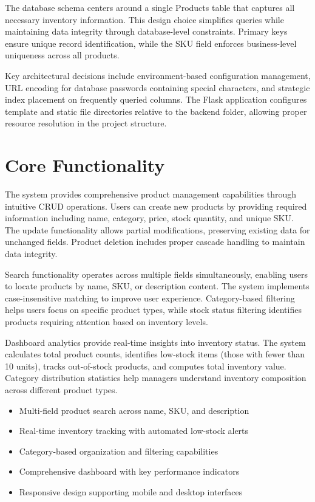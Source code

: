 \documentclass[12pt,a4paper]{article}
\begin{document}
The database schema centers around a single Products table that captures all necessary inventory information. This design choice simplifies queries while maintaining data integrity through database-level constraints. Primary keys ensure unique record identification, while the SKU field enforces business-level uniqueness across all products.

Key architectural decisions include environment-based configuration management, URL encoding for database passwords containing special characters, and strategic index placement on frequently queried columns. The Flask application configures template and static file directories relative to the backend folder, allowing proper resource resolution in the project structure.

\section{Core Functionality}

The system provides comprehensive product management capabilities through intuitive CRUD operations. Users can create new products by providing required information including name, category, price, stock quantity, and unique SKU. The update functionality allows partial modifications, preserving existing data for unchanged fields. Product deletion includes proper cascade handling to maintain data integrity.

Search functionality operates across multiple fields simultaneously, enabling users to locate products by name, SKU, or description content. The system implements case-insensitive matching to improve user experience. Category-based filtering helps users focus on specific product types, while stock status filtering identifies products requiring attention based on inventory levels.

Dashboard analytics provide real-time insights into inventory status. The system calculates total product counts, identifies low-stock items (those with fewer than 10 units), tracks out-of-stock products, and computes total inventory value. Category distribution statistics help managers understand inventory composition across different product types.

\begin{infobox}
\begin{itemize}
    \item Multi-field product search across name, SKU, and description
    \item Real-time inventory tracking with automated low-stock alerts
    \item Category-based organization and filtering capabilities
    \item Comprehensive dashboard with key performance indicators
    \item Responsive design supporting mobile and desktop interfaces
\end{itemize}
\end{infobox}
\end{document}
